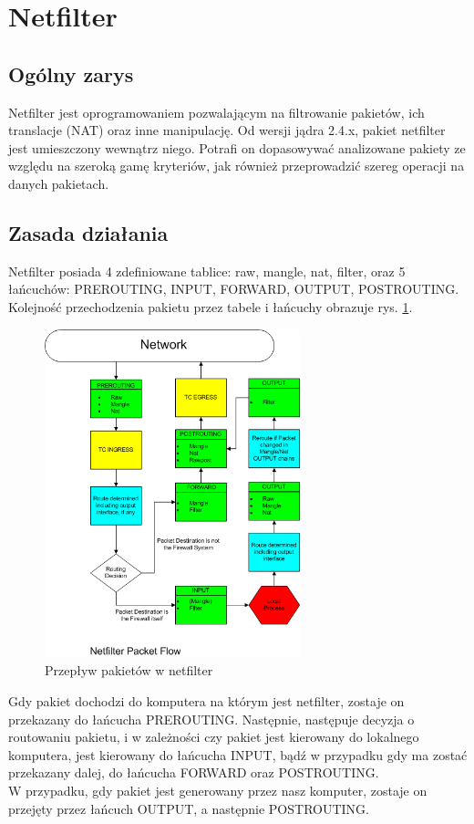 \documentclass[a4paper,12pt]{book}
\begin{document}
	\section{Netfilter}
		\subsection{Ogólny zarys}
			Netfilter jest oprogramowaniem pozwalającym na filtrowanie pakietów, ich translacje (NAT) oraz inne manipulację.
			Od wersji jądra 2.4.x, pakiet netfilter jest umieszczony wewnątrz niego.
			Potrafi on dopasowywać analizowane pakiety ze względu na szeroką gamę kryteriów, jak również przeprowadzić szereg operacji na danych pakietach.
		\subsection{Zasada działania}
			Netfilter posiada 4 zdefiniowane tablice: raw, mangle, nat, filter, oraz 5 łańcuchów: PREROUTING, INPUT, FORWARD, OUTPUT, POSTROUTING.
			Kolejność przechodzenia pakietu przez tabele i łańcuchy obrazuje rys. \ref{fig:flowchart}.\\
			\begin{figure}[h]
				\centering
					\includegraphics[width=280px]{Netfilter.png}
					\caption{Przepływ pakietów w netfilter}
					\label{fig:flowchart}
			\end{figure}
			Gdy pakiet dochodzi do komputera na którym jest netfilter, zostaje on przekazany do łańcucha PREROUTING. Następnie, następuje decyzja o routowaniu pakietu, i w zależności czy pakiet jest kierowany do lokalnego komputera, jest kierowany do łańcucha INPUT, bądź w przypadku gdy ma zostać przekazany dalej, do łańcucha FORWARD oraz POSTROUTING.\\
			W przypadku, gdy pakiet jest generowany przez nasz komputer, zostaje on przejęty przez łańcuch OUTPUT, a następnie POSTROUTING.
\end{document}
